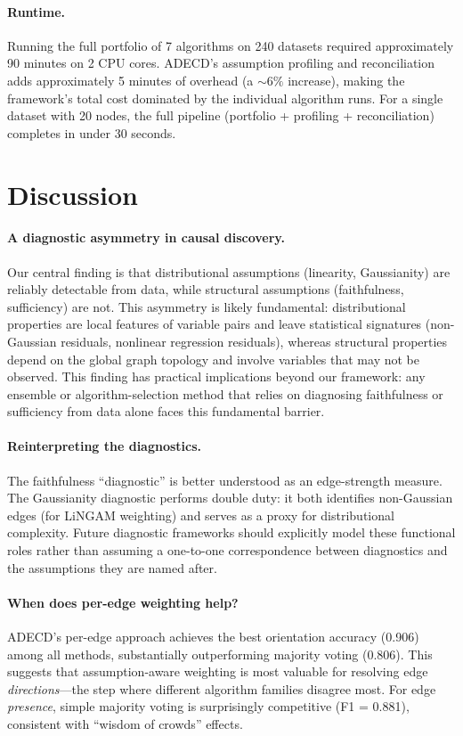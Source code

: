 \documentclass{article}
\newcommand{\adecd}{\textsc{ADECD}}
\begin{document}
\paragraph{Runtime.}
Running the full portfolio of 7 algorithms on 240 datasets required approximately 90 minutes on 2 CPU cores.
\adecd{}'s assumption profiling and reconciliation adds approximately 5 minutes of overhead (a ${\sim}6\%$ increase), making the framework's total cost dominated by the individual algorithm runs.
For a single dataset with 20 nodes, the full pipeline (portfolio + profiling + reconciliation) completes in under 30 seconds.

\section{Discussion}
\label{sec:discussion}

\paragraph{A diagnostic asymmetry in causal discovery.}
Our central finding is that distributional assumptions (linearity, Gaussianity) are reliably detectable from data, while structural assumptions (faithfulness, sufficiency) are not.
This asymmetry is likely fundamental: distributional properties are local features of variable pairs and leave statistical signatures (non-Gaussian residuals, nonlinear regression residuals), whereas structural properties depend on the global graph topology and involve variables that may not be observed.
This finding has practical implications beyond our framework: any ensemble or algorithm-selection method that relies on diagnosing faithfulness or sufficiency from data alone faces this fundamental barrier.

\paragraph{Reinterpreting the diagnostics.}
The faithfulness ``diagnostic'' is better understood as an edge-strength measure.
The Gaussianity diagnostic performs double duty: it both identifies non-Gaussian edges (for LiNGAM weighting) and serves as a proxy for distributional complexity.
Future diagnostic frameworks should explicitly model these functional roles rather than assuming a one-to-one correspondence between diagnostics and the assumptions they are named after.

\paragraph{When does per-edge weighting help?}
\adecd{}'s per-edge approach achieves the best orientation accuracy (0.906) among all methods, substantially outperforming majority voting (0.806).
This suggests that assumption-aware weighting is most valuable for resolving edge \emph{directions}---the step where different algorithm families disagree most.
For edge \emph{presence}, simple majority voting is surprisingly competitive (F1 = 0.881), consistent with ``wisdom of crowds'' effects.
\end{document}
